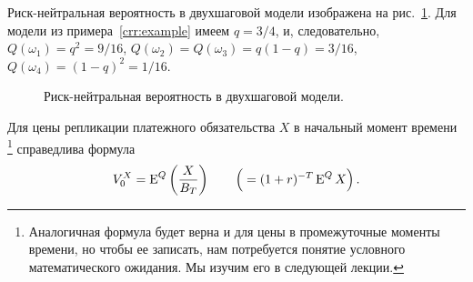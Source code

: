 \begin{example}
Риск-нейтральная вероятность в двухшаговой модели изображена на рис.~\ref{crr:fig:risk-neutral}. Для модели из примера~\ref{crr:example} имеем $q=3/4$, и, следовательно, $Q(\omega_1)=q^2 = 9/16$, $Q(\omega_2)=Q(\omega_3)=q(1-q) = 3/16$, $Q(\omega_4)=(1-q)^2 = 1/16$.

\begin{figure}[h]
\centering
{}
\caption{Риск-нейтральная вероятность в двухшаговой модели.}
\label{crr:fig:risk-neutral}
\end{figure}
\end{example}

\begin{theorem}
Для цены репликации платежного обязательства $X$ в начальный момент времени%
\footnote{Аналогичная формула будет верна и для цены в промежуточные моменты времени, но чтобы ее записать, нам потребуется понятие условного математического ожидания.
Мы изучим его в следующей лекции.} справедлива формула
\[
V_0^X = \operatorname{E}^Q\left(\frac{X}{B_T}\right) \qquad \left(\;= (1+r)^{-T} \operatorname{E}^Q X\right).
\]
\end{theorem}

